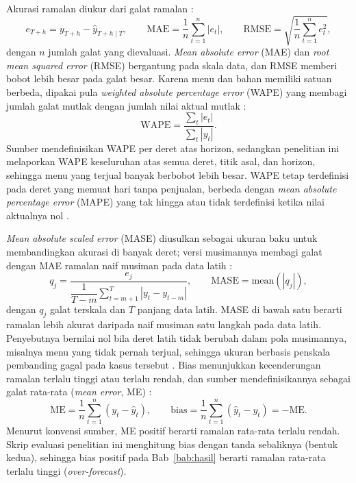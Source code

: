 Akurasi ramalan diukur dari galat ramalan \citep*{hyndman2021forecasting}:
\begin{equation}
e_{T+h} = y_{T+h} - \hat{y}_{T+h\mid T}, \qquad \mathrm{MAE} = \frac{1}{n}\sum_{t=1}^{n} |e_t|, \qquad \mathrm{RMSE} = \sqrt{\frac{1}{n}\sum_{t=1}^{n} e_t^2},
\label{eq:mae-rmse}
\end{equation}
dengan $n$ jumlah galat yang dievaluasi. \textit{Mean absolute error} (MAE) dan \textit{root mean squared error} (RMSE) bergantung pada skala data, dan RMSE memberi bobot lebih besar pada galat besar. Karena menu dan bahan memiliki satuan berbeda, dipakai pula \textit{weighted absolute percentage error} (WAPE) yang membagi jumlah galat mutlak dengan jumlah nilai aktual mutlak \citep*{hewamalage2022forecast}:
\begin{equation}
\mathrm{WAPE} = \frac{\sum_{t} |e_t|}{\sum_{t} |y_t|}.
\label{eq:wape}
\end{equation}
Sumber mendefinisikan WAPE per deret atas horizon, sedangkan penelitian ini melaporkan WAPE keseluruhan atas semua deret, titik asal, dan horizon, sehingga menu yang terjual banyak berbobot lebih besar. WAPE tetap terdefinisi pada deret yang memuat hari tanpa penjualan, berbeda dengan \textit{mean absolute percentage error} (MAPE) yang tak hingga atau tidak terdefinisi ketika nilai aktualnya nol \citep*{hyndman2006another, hewamalage2022forecast}.

\textit{Mean absolute scaled error} (MASE) diusulkan \citet*{hyndman2006another} sebagai ukuran baku untuk membandingkan akurasi di banyak deret; versi musimannya membagi galat dengan MAE ramalan naif musiman pada data latih \citep*{hyndman2021forecasting}:
\begin{equation}
q_j = \frac{e_j}{\dfrac{1}{T-m}\displaystyle\sum_{t=m+1}^{T} |y_t - y_{t-m}|}, \qquad \mathrm{MASE} = \mathrm{mean}(|q_j|),
\label{eq:mase}
\end{equation}
dengan $q_j$ galat terskala dan $T$ panjang data latih. MASE di bawah satu berarti ramalan lebih akurat daripada naif musiman satu langkah pada data latih. Penyebutnya bernilai nol bila deret latih tidak berubah dalam pola musimannya, misalnya menu yang tidak pernah terjual, sehingga ukuran berbasis penskala pembanding gagal pada kasus tersebut \citep*{hewamalage2022forecast}. Bias menunjukkan kecenderungan ramalan terlalu tinggi atau terlalu rendah, dan sumber mendefinisikannya sebagai galat rata-rata (\textit{mean error}, ME) \citep*{hewamalage2022forecast}:
\begin{equation}
\mathrm{ME} = \frac{1}{n}\sum_{t=1}^{n} \left(y_t - \hat{y}_t\right), \qquad \mathrm{bias} = \frac{1}{n}\sum_{t=1}^{n} \left(\hat{y}_t - y_t\right) = -\mathrm{ME}.
\label{eq:bias}
\end{equation}
Menurut konvensi sumber, ME positif berarti ramalan rata-rata terlalu rendah. Skrip evaluasi penelitian ini menghitung bias dengan tanda sebaliknya (bentuk kedua), sehingga bias positif pada Bab~\ref{bab:hasil} berarti ramalan rata-rata terlalu tinggi (\textit{over-forecast}).

